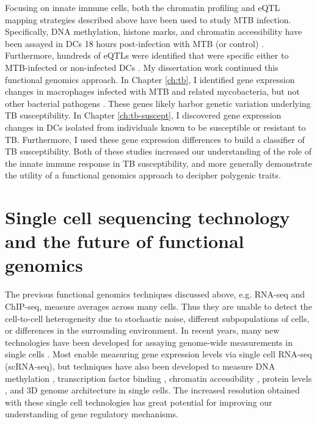 Focusing on innate immune cells, both the chromatin profiling and eQTL
mapping strategies described above have been used to study MTB
infection. Specifically, DNA methylation, histone marks, and chromatin
accessibility have been assayed in DCs 18 hours post-infection with
MTB (or control) \citep{Pacis2015}. Furthermore, hundreds of eQTLs
were identified that were specific either to MTB-infected or
non-infected DCs \citep{Barreiro2012}. My dissertation work continued
this functional genomics approach. In Chapter \ref{ch:tb}, I
identified gene expression changes in macrophages infected with MTB
and related mycobacteria, but not other bacterial pathogens \citep{Blischak2015}. These
genes likely harbor genetic variation underlying TB susceptibility. In
Chapter \ref{ch:tb-suscept}, I discovered gene expression changes in
DCs isolated from individuals known to be susceptible or resistant to
TB. Furthermore, I used these gene expression differences to build a
classifier of TB susceptibility. Both of these studies increased our
understanding of the role of the innate immune response in TB
susceptibility, and more generally demonstrate the utility of a
functional genomics approach to decipher polygenic traits.


\section{Single cell sequencing technology and the future of functional genomics}

The previous functional genomics techniques discussed above,
e.g. RNA-seq and ChIP-seq, measure averages across many cells. Thus
they are unable to detect the cell-to-cell heterogeneity due to
stochastic noise, different subpopulations of cells, or differences in
the surrounding environment. In recent years, many new technologies
have been developed for assaying genome-wide measurements in single
cells \citep{Liang2014, Macaulay2014, Saliba2014, Grun2015, Stegle2015, Bacher2016}.
Most enable measuring gene expression levels via single cell
RNA-seq (scRNA-seq), but techniques have also been developed to
measure DNA methylation \citep{Smallwood2014, Angermueller2016},
transcription factor binding \citep{Rotem2015},
chromatin accessibility \citep{Buenrostro2015, Cusanovich2015},
protein levels \citep{Genshaft2016}, and 3D genome architecture \citep{Nagano2013}
in single cells. The increased resolution
obtained with these single cell technologies has great potential for
improving our understanding of gene regulatory mechanisms.

